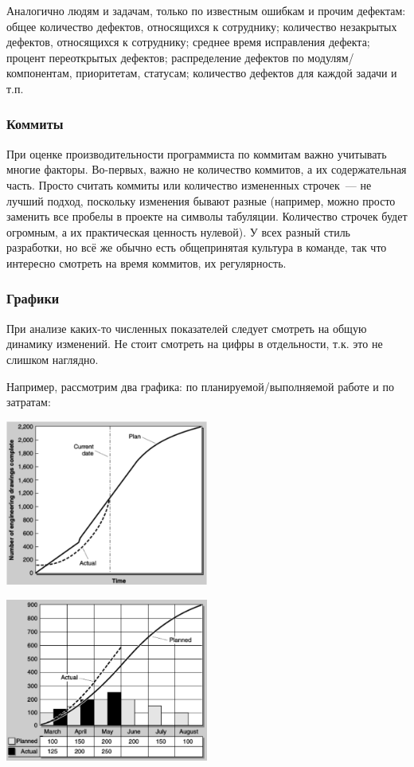 \documentclass{../../text-style}
\begin{document}
Аналогично людям и задачам, только по известным ошибкам и прочим дефектам: общее количество дефектов, относящихся к сотруднику; количество незакрытых дефектов, относящихся к сотруднику; среднее время исправления дефекта; процент переоткрытых дефектов; распределение дефектов по модулям/компонентам, приоритетам, статусам; количество дефектов для каждой задачи  и т.п.

\subsubsection{Коммиты}

При оценке производительности программиста по коммитам важно учитывать многие факторы. Во-первых, важно не количество коммитов, а их содержательная часть. Просто считать коммиты или количество измененных строчек~--- не лучший подход, поскольку изменения бывают разные (например, можно просто заменить все пробелы в проекте на символы табуляции. Количество строчек будет огромным, а их практическая ценность нулевой). У всех разный стиль разработки, но всё же обычно есть общепринятая культура в команде, так что интересно смотреть на время коммитов, их регулярность.

\subsubsection{Графики}

При анализе каких-то численных показателей следует смотреть на общую динамику изменений. Не стоит смотреть на цифры в отдельности, т.к. это не слишком наглядно.

Например, рассмотрим два графика: по планируемой/выполняемой работе и по затратам:

\begin{center}
    \includegraphics[width=0.5\textwidth]{plannedWorkGraph.png}
\end{center}

\begin{center}
    \includegraphics[width=0.5\textwidth]{costGraph.png}
\end{center}
\end{document}
